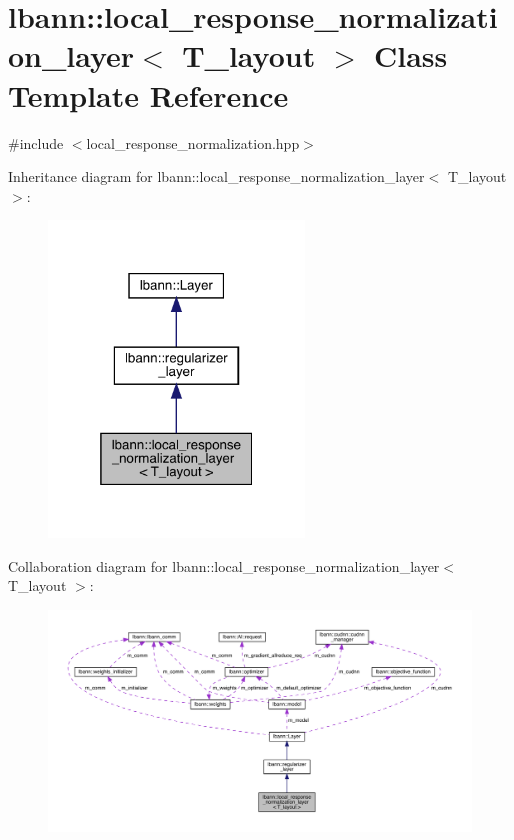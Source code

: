 \hypertarget{classlbann_1_1local__response__normalization__layer}{}\section{lbann\+:\+:local\+\_\+response\+\_\+normalization\+\_\+layer$<$ T\+\_\+layout $>$ Class Template Reference}
\label{classlbann_1_1local__response__normalization__layer}


{\ttfamily \#include $<$local\+\_\+response\+\_\+normalization.\+hpp$>$}



Inheritance diagram for lbann\+:\+:local\+\_\+response\+\_\+normalization\+\_\+layer$<$ T\+\_\+layout $>$\+:\nopagebreak
\begin{figure}[H]
\begin{center}
\leavevmode
\includegraphics[width=193pt]{classlbann_1_1local__response__normalization__layer__inherit__graph}
\end{center}
\end{figure}


Collaboration diagram for lbann\+:\+:local\+\_\+response\+\_\+normalization\+\_\+layer$<$ T\+\_\+layout $>$\+:\nopagebreak
\begin{figure}[H]
\begin{center}
\leavevmode
\includegraphics[width=350pt]{classlbann_1_1local__response__normalization__layer__coll__graph}
\end{center}
\end{figure}
